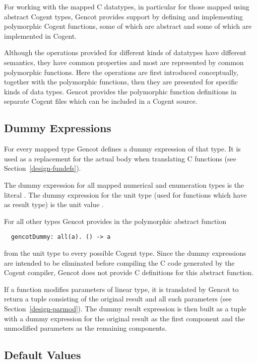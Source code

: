 For working with the mapped C datatypes, in particular for those mapped using abstract Cogent types, Gencot provides support by
defining and implementing polymorphic Cogent functions, some of which are abstract and some of which are implemented in Cogent.

Although the operations provided for different kinds of datatypes have different semantics, they have common properties
and most are represented by common polymorphic functions. Here the operations are first introduced conceptually, together with
the polymorphic functions, then they are presented for specific kinds of data types.
Gencot provides the polymorphic function definitions in separate Cogent files which can be
included in a Cogent source.

\subsection{Dummy Expressions}
\label{design-operations-dummy}

For every mapped type Gencot defines a dummy expression of that type. It is used as a replacement for the actual 
body when translating C functions (see Section~\ref{design-fundefs}).

The dummy expression for all mapped numerical and enumeration types is the literal .
The dummy expression for the unit type (used for functions which have  as result type) is the 
unit value \code{()}.

For all other types Gencot provides in  the polymorphic abstract function
\begin{verbatim}
  gencotDummy: all(a). () -> a
\end{verbatim}
from the unit type to every possible Cogent type. Since the dummy expressions are intended to be eliminated before compiling the 
C code generated by the Cogent compiler, Gencot does not provide C definitions for this abstract function. 

If a function modifies parameters of linear type, it is translated by Gencot to return a tuple consisting of the 
original result and all such parameters (see Section~\ref{design-parmod}).
The dummy result expression is then built as a tuple with a dummy expression for the original result as the first component 
and the unmodified parameters as the remaining components.

\subsection{Default Values}
\label{design-operations-default}

